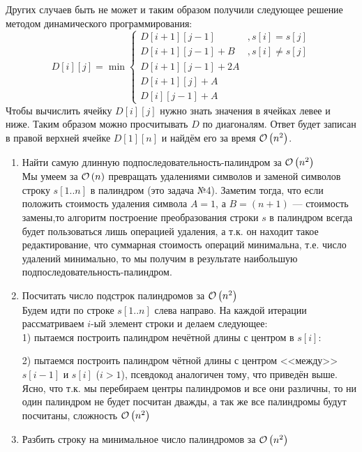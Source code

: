 Других случаев быть не может и таким образом получили следующее решение методом динамического программирования:
\[
D[i][j] = \min
\begin{cases}
D[i+1][j-1] &, s[i]=s[j] \\
D[i+1][j-1]+B &, s[i]\neq s[j]\\
D[i+1][j-1]+2A\\
D[i+1][j]+A \\
D[i][j-1]+A
\end{cases}
\]
Чтобы вычислить ячейку $D[i][j]$ нужно знать значения в ячейках левее и ниже. Таким образом можно просчитывать $D$ 
по диагоналям. Ответ будет записан в правой верхней ячейке $D[1][n]$ и найдём его за время $\mathcal{O}\left(n^2\right)$. \xqed
\task{-}
\begin{enumerate}[label=(\alph*)]
	\item Найти самую длинную подпоследовательность-палиндром за $\mathcal{O}\left(n^2\right)$\\
	Мы умеем за $\mathcal{O}\left(n\right)$ превращать удалениями символов и заменой символов строку $s[1..n]$ в палиндром (это
	задача №4). Заметим тогда, что если положить стоимость удаления символа $A=1$, а $B=(n+1)$ --- стоимость замены,то
	алгоритм построение преобразования строки $s$ в палиндром всегда будет пользоваться лишь операцией удаления, а т.к.
	он находит такое редактирование, что суммарная стоимость операций минимальна, т.е. число удалений минимально, то
	мы получим в результате наибольшую подпоследовательность-палиндром. \xqed
	\item Посчитать число подстрок палиндромов за $\mathcal{O}\left(n^2\right)$\\
	Будем идти по строке $s[1..n]$ слева направо. На каждой итерации рассматриваем $i$-ый элемент строки и делаем
	следующее:\\
	1) пытаемся построить палиндром нечётной длины с центром в $s[i]$:
	\begin{algorithmic}
	\EndWhile
	\end{algorithmic}
	2) пытаемся построить палиндром чётной длины с центром <<между>> $s[i-1]$ и $s[i]$ ($i > 1$), псевдокод аналогичен
	тому, что приведён выше.\\
	Ясно, что т.к. мы перебираем центры палиндромов и все они различны, то ни один палиндром не будет посчитан дважды,
	а так же все палиндромы будут посчитаны, сложность $\mathcal{O}\left(n^2\right)$
	\item Разбить строку на минимальное число палиндромов за $\mathcal{O}\left(n^2\right)$\\

\end{enumerate}
